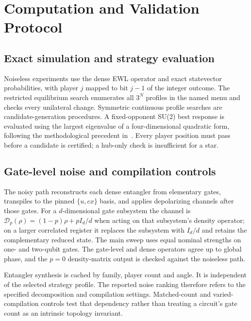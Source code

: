 \section{Computation and Validation Protocol}\label{sec:methods}
\subsection{Exact simulation and strategy evaluation}
Noiseless experiments use the dense EWL operator and exact statevector
probabilities, with player $j$ mapped to bit $j-1$ of the integer outcome.
The restricted equilibrium search enumerates all $3^N$ profiles in the
named menu and checks every unilateral change. Symmetric continuous
profile searches are candidate-generation procedures. A fixed-opponent
SU(2) best response is evaluated using the largest eigenvalue of a
four-dimensional quadratic form, following the methodological precedent
in~\cite{landsburg2011}. Every player position must pass before a candidate
is certified; a hub-only check is insufficient for a star.

\subsection{Gate-level noise and compilation controls}
The noisy path reconstructs each dense entangler from elementary gates,
transpiles to the pinned $\{u,cx\}$ basis, and applies depolarizing channels
after those gates. For a $d$-dimensional gate subsystem the channel is
$\mathcal D_p(\rho)=(1-p)\rho+pI_d/d$ when acting on that subsystem's
density operator; on a larger correlated register it replaces the
subsystem with $I_d/d$ and retains the complementary reduced state.
The main sweep uses equal nominal strengths on one- and two-qubit gates.
The gate-level and dense operators agree up to global phase, and the
$p=0$ density-matrix output is checked against the noiseless path.

Entangler synthesis is cached by family, player count and angle. It is
independent of the selected strategy profile. The reported noise ranking
therefore refers to the specified decomposition and compilation settings.
Matched-count and varied-compilation controls test that dependency rather
than treating a circuit's gate count as an intrinsic topology invariant.

